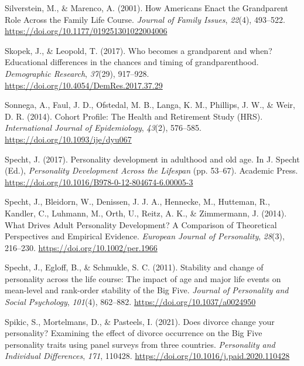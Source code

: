 \documentclass[
  english,
  man,floatsintext]{apa7}
\begin{document}
\leavevmode\hypertarget{ref-silversteinHowAmericansEnact2001}{}%
Silverstein, M., \& Marenco, A. (2001). How Americans Enact the Grandparent Role Across the Family Life Course. \emph{Journal of Family Issues}, \emph{22}(4), 493--522. \url{https://doi.org/10.1177/019251301022004006}

\leavevmode\hypertarget{ref-skopekWhoBecomesGrandparent2017}{}%
Skopek, J., \& Leopold, T. (2017). Who becomes a grandparent and when? Educational differences in the chances and timing of grandparenthood. \emph{Demographic Research}, \emph{37}(29), 917--928. \url{https://doi.org/10.4054/DemRes.2017.37.29}

\leavevmode\hypertarget{ref-sonnegaCohortProfileHealth2014}{}%
Sonnega, A., Faul, J. D., Ofstedal, M. B., Langa, K. M., Phillips, J. W., \& Weir, D. R. (2014). Cohort Profile: The Health and Retirement Study (HRS). \emph{International Journal of Epidemiology}, \emph{43}(2), 576--585. \url{https://doi.org/10.1093/ije/dyu067}

\leavevmode\hypertarget{ref-spechtPersonalityDevelopmentAdulthood2017}{}%
Specht, J. (2017). Personality development in adulthood and old age. In J. Specht (Ed.), \emph{Personality Development Across the Lifespan} (pp. 53--67). Academic Press. \url{https://doi.org/10.1016/B978-0-12-804674-6.00005-3}

\leavevmode\hypertarget{ref-spechtWhatDrivesAdult2014}{}%
Specht, J., Bleidorn, W., Denissen, J. J. A., Hennecke, M., Hutteman, R., Kandler, C., Luhmann, M., Orth, U., Reitz, A. K., \& Zimmermann, J. (2014). What Drives Adult Personality Development? A Comparison of Theoretical Perspectives and Empirical Evidence. \emph{European Journal of Personality}, \emph{28}(3), 216--230. \url{https://doi.org/10.1002/per.1966}

\leavevmode\hypertarget{ref-spechtStabilityChangePersonality2011}{}%
Specht, J., Egloff, B., \& Schmukle, S. C. (2011). Stability and change of personality across the life course: The impact of age and major life events on mean-level and rank-order stability of the Big Five. \emph{Journal of Personality and Social Psychology}, \emph{101}(4), 862--882. \url{https://doi.org/10.1037/a0024950}

\leavevmode\hypertarget{ref-spikicDoesDivorceChange2021}{}%
Spikic, S., Mortelmans, D., \& Pasteels, I. (2021). Does divorce change your personality? Examining the effect of divorce occurrence on the Big Five personality traits using panel surveys from three countries. \emph{Personality and Individual Differences}, \emph{171}, 110428. \url{https://doi.org/10.1016/j.paid.2020.110428}
\end{document}
